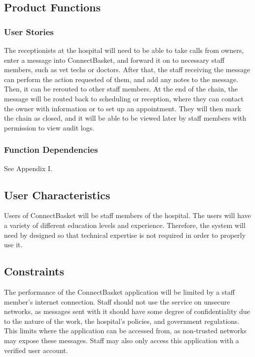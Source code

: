 \documentclass[onecolumn, draftclsnofoot,10pt, compsoc]{IEEEtran}
\begin{document}
\subsection{Product Functions}
\subsubsection{User Stories}
The receptionists at the hospital will need to be able to take calls from owners, enter a message into ConnectBasket, and forward it on to necessary staff members, such as vet techs or doctors. After that, the staff receiving the message can perform the action requested of them, and add any notes to the message. Then, it can be rerouted to other staff members. At the end of the chain, the message will be routed back to scheduling or reception, where they can contact the owner with information or to set up an appointment. They will then mark the chain as closed, and it will be able to be viewed later by staff members with permission to view audit logs.
\subsubsection{Function Dependencies}
See Appendix I.

\subsection{User Characteristics}
Users of ConnectBasket will be staff members of the hospital. The users will have a variety of different education levels and experience. Therefore, the system will need by designed so that technical expertise is not required in order to properly use it.

\subsection{Constraints}
The performance of the ConnectBasket application will be limited by a staff member's internet connection. Staff should not use the service on unsecure networks, as messages sent with it should have some degree of confidentiality due to the nature of the work, the hospital's policies, and government regulations. This limits where the application can be accessed from, as non-trusted networks may expose these messages. Staff may also only access this application with a verified user account.
\end{document}
